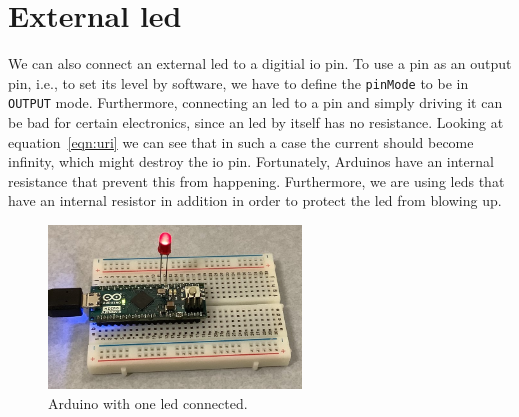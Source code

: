 
\section{External \acs{led}}

We can also connect an external \ac{led} to a digitial \ac{io} pin. To use a pin as an output pin, i.e., to set its level by software, we have to define the \lstinline{pinMode} to be in \lstinline{OUTPUT} mode. Furthermore, connecting an \ac{led} to a pin and simply driving it can be bad for certain electronics, since an \ac{led} by itself has no resistance. Looking at equation~\eqref{eqn:uri} we can see that in such a case the current should become infinity, which might destroy the \ac{io} pin. Fortunately, Arduinos have an internal resistance that prevent this from happening. Furthermore, we are using \acp{led} that have an internal resistor in addition in order to protect the \ac{led} from blowing up.

\begin{figure}[htb]
    \centering
    \includegraphics[width=0.6\textwidth]{graphics/01_blink/arduino_led.jpg}
    \caption{Arduino with one \ac{led} connected.}
    \label{fig:blink:arduino_led}
\end{figure}

